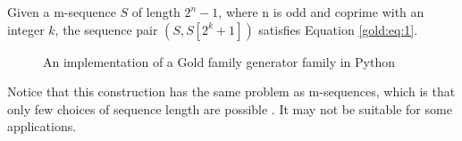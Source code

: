 \begin{property}
  Given a m-sequence $S$ of length $2^n - 1$, where n is odd and
  coprime with an integer $k$, the sequence pair $(S, S[2^{k} + 1])$
  satisfies Equation \eqref{gold:eq:1}.
\end{property}

\begin{figure}[ht!]
  \caption{An  implementation of a Gold family generator family in Python}
  \label{}
\end{figure}


Notice that this construction has the same problem as m-sequences, which is that only few choices of  sequence length are possible . It may not be suitable for some applications.
